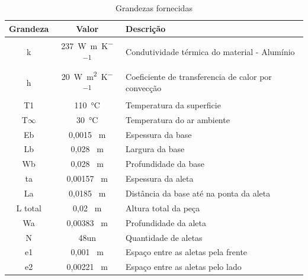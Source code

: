 \begin{table}[h]
    \ABNTEXfontereduzida
    \centering
    \caption{Grandezas fornecidas}
    \label{tab:grandezasFornecidas}
    \begin{tabular}{c c l}\toprule
        Grandeza    & Valor                                      & Descrição                                           \\
        \toprule
        k           & \SI{237}{\watt\per\meter\per\kelvin}       & Condutividade térmica do material - Alumínio        \\
        h           & \SI{20}{\watt\per\square\meter\per\kelvin} & Coeficiente de transferencia de calor por convecção \\
        T1          & \SI{110}\degreeCelsius                     & Temperatura da superficie                           \\
        T\(\infty\) & \SI{30}\degreeCelsius                      & Temperatura do ar ambiente                          \\
        Eb          & 0,0015 \SI{}{\meter}                       & Espessura da base                                   \\
        Lb          & 0,028 \SI{}{\meter}                        & Largura da base                                     \\
        Wb          & 0,028 \SI{}{\meter}                        & Profundidade da base                                \\
        ta          & 0,00157 \SI{}{\meter}                      & Espessura da aleta                                  \\
        La          & 0,0185 \SI{}{\meter}                       & Distância da base até na ponta da aleta             \\
        L total     & 0,02 \SI{}{\meter}                         & Altura total da peça                                \\
        Wa          & 0,00383 \SI{}{\meter}                      & Profundidade da aleta                               \\
        N           & 48un                                       & Quantidade de aletas                                \\
        e1          & 0,001 \SI{}{\meter}                        & Espaço entre as aletas pela frente                  \\
        e2          & 0,00221 \SI{}{\meter}                      & Espaço entre as aletas pelo lado                    \\
        \bottomrule
    \end{tabular}
    \fonteproprioautor
\end{table}